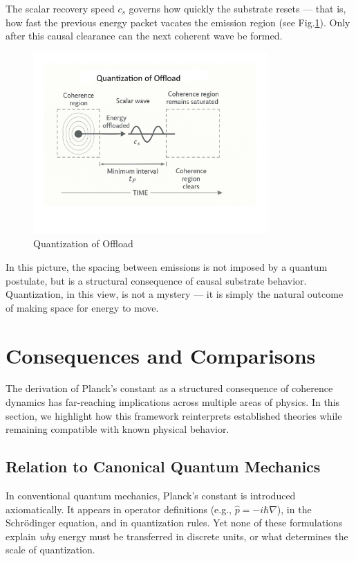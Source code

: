 \documentclass[ht-mathphys]{ht-fmt}
\theoremstyle{thmstyleone}%
\theoremstyle{thmstyletwo}%
\theoremstyle{thmstylethree}%
\begin{document}
The scalar recovery speed \( c_s \) governs how quickly the substrate resets — that is, how fast the previous energy packet vacates the emission region (see Fig.\ref{fig:qsd_gap}). Only after this causal clearance can the next coherent wave be formed. 

\begin{figure}[H]
    \centering
    \includegraphics[width=0.8\textwidth]{figures/qsd_quantized_diagram.pdf}
    \caption{Quantization of Offload}
    \label{fig:qsd_gap}
\end{figure}


In this picture, the spacing between emissions is not imposed by a quantum postulate, but is a structural consequence of causal substrate behavior. Quantization, in this view, is not a mystery — it is simply the natural outcome of making space for energy to move.


\section{Consequences and Comparisons}

The derivation of Planck’s constant as a structured consequence of coherence dynamics has far-reaching implications across multiple areas of physics. In this section, we highlight how this framework reinterprets established theories while remaining compatible with known physical behavior.

\subsection{Relation to Canonical Quantum Mechanics}

In conventional quantum mechanics, Planck’s constant is introduced axiomatically. It appears in operator definitions (e.g., $\hat{p} = -i\hbar \nabla$), in the Schrödinger equation, and in quantization rules. Yet none of these formulations explain \textit{why} energy must be transferred in discrete units, or what determines the scale of quantization.
\end{document}
